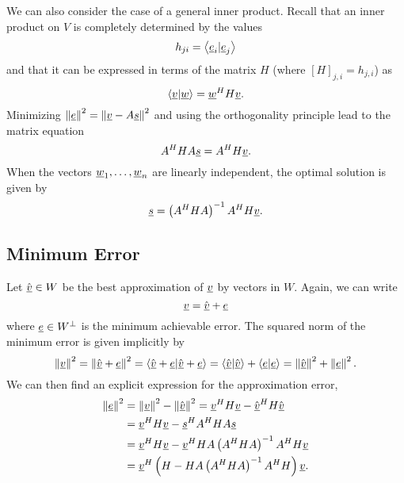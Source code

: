 We can also consider the case of a general inner product.
Recall that an inner product on $V$ is completely determined by the values
\begin{equation*}
h_{ji} = \left\langle \underline{e}_i | \underline{e}_j \right\rangle
\end{equation*}
and that it can be expressed in terms of the matrix $H$ (where $[H]_{j,i} = h_{j,i}$) as
\begin{equation*}
\left\langle \underline{v} | \underline{w} \right\rangle
= \underline{w}^H H \underline{v}.
\end{equation*}
Minimizing $\left\| \underline{e} \right\|^2 = \left\| \underline{v} - A \underline{s} \right\|^2$ and using the orthogonality principle lead to the matrix equation
\begin{equation*}
A^H H A \underline{s} = A^H H \underline{v}.
\end{equation*}
When the vectors $\underline{w}_1, \ldots, \underline{w}_n$ are linearly independent, the optimal solution is given by
\begin{equation*}
\underline{s} = \left( A^H H A \right)^{-1} A^H H \underline{v}.
\end{equation*}


\subsection{Minimum Error}

Let $\hat{\underline{v}} \in W$ be the best approximation of $\underline{v}$ by vectors in $W$.
Again, we can write
\begin{equation*}
\underline{v} = \hat{\underline{v}} + \underline{e}
\end{equation*}
where $\underline{e} \in W^{\bot}$ is the minimum achievable error.
The squared norm of the minimum error is given implicitly by
\begin{equation*}
\left\| \underline{v} \right\|^2
= \left\| \hat{\underline{v}} + \underline{e} \right\|^2
= \left\langle \hat{\underline{v}} + \underline{e} | \hat{\underline{v}} + \underline{e} \right\rangle
= \left\langle \hat{\underline{v}} | \hat{\underline{v}} \right\rangle
+ \left\langle \underline{e} | \underline{e} \right\rangle
= \left\| \hat{\underline{v}} \right\|^2 + \left\| \underline{e} \right\|^2 .
\end{equation*}
We can then find an explicit expression for the approximation error,
\begin{equation*}
\begin{split}
\left\| \underline{e} \right\|^2
&= \left\| \underline{v} \right\|^2
- \left\| \hat{\underline{v}} \right\|^2
= \underline{v}^H H \underline{v} - \hat{\underline{v}}^H H \hat{\underline{v}} \\
&= \underline{v}^H H \underline{v} - \underline{s}^H A^H H A \underline{s} \\
&= \underline{v}^H H \underline{v}
- \underline{v}^H H A \left( A^H H A \right)^{-1} A^H H \underline{v} \\
&= \underline{v}^H
\left( H -  H A \left( A^H H A \right)^{-1} A^H H \right)
\underline{v}.
\end{split}
\end{equation*}



